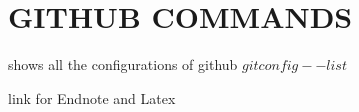 \section{GITHUB COMMANDS}
shows all the configurations of github
$git config --list$

link for Endnote and Latex
